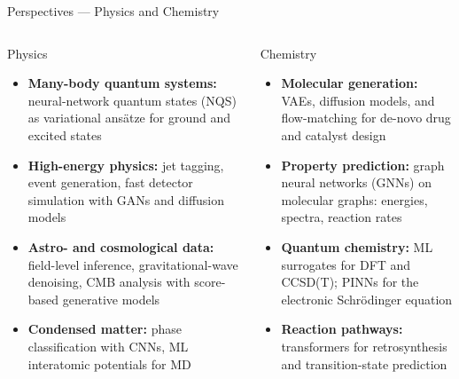 \documentclass[aspectratio=169,11pt]{beamer}
\begin{document}
\begin{frame}{Perspectives --- Physics and Chemistry}
  \begin{columns}[T]
      \begin{block}{Physics}
        \begin{itemize}\itemsep2pt
          \item \textbf{Many-body quantum systems:}
                neural-network quantum states (NQS)
                as variational ans\"{a}tze for ground
                and excited states
          \item \textbf{High-energy physics:}
                jet tagging, event generation,
                fast detector simulation with
                GANs and diffusion models
          \item \textbf{Astro- and cosmological data:}
                field-level inference, gravitational-wave
                denoising, CMB analysis with
                score-based generative models
          \item \textbf{Condensed matter:}
                phase classification with CNNs,
                ML interatomic potentials for MD
        \end{itemize}
      \end{block}
      \begin{block}{Chemistry}
        \begin{itemize}\itemsep2pt
          \item \textbf{Molecular generation:}
                VAEs, diffusion models, and flow-matching
                for de-novo drug and catalyst design
          \item \textbf{Property prediction:}
                graph neural networks (GNNs) on
                molecular graphs: energies, spectra,
                reaction rates
          \item \textbf{Quantum chemistry:}
                ML surrogates for DFT and CCSD(T);
                PINNs for the electronic
                Schr\"{o}dinger equation
          \item \textbf{Reaction pathways:}
                transformers for retrosynthesis and
                transition-state prediction
        \end{itemize}
      \end{block}
  \end{columns}
\end{frame}
\end{document}
